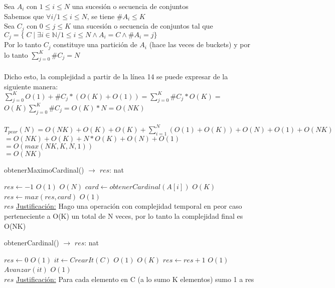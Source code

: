 \documentclass[10pt, a4paper]{article}
\begin{document}
Sea $A_i$ con $1 \leq i \leq N$ una sucesión o secuencia de conjuntos\\
Sabemos que $\forall i / 1 \leq i \leq N$, se tiene $\#A_i \leq K$\\
Sea $C_j$ con $0 \leq j \leq K$ una sucesión o secuencia de conjuntos tal que\\
$C_j = \{ \; C \; | \; \exists i \in \mathbb{N} / 1 \leq i \leq N \wedge A_i = C \wedge \#A_i = j \}$ \\
Por lo tanto $C_j$ constituye una partición de $A_i$ (hace las veces de buckets) y por lo tanto $\sum_{j=0}^{K}\#C_j = N$ \\ \\
Dicho esto, la complejidad a partir de la línea 14 se puede expresar de la siguiente manera: \\
$\sum_{j=0}^{K} O(1) + \#C_j * (O(K) + O(1)) = \sum_{j=0}^{K}\#C_j * O(K) =$\\
$O(K)\sum_{j=0}^{K}\#C_j = O(K)*N = O(NK)$
\\\\
 
$T_{peor}(N) = O(NK) + O(K) + O(K) + \sum_{i=1}^{N}(O(1) + O(K)) + O(N) + O(1) + O(NK)$\\
$= O(NK) + O(K) + N*O(K) + O(N) + O(1)$ \\
$= O(max(NK, K, N, 1))$\\
$= O(NK)$\\

\begin{algorithm}[H]{obtenerMaximoCardinal() $\to$ $res$: nat}	
	\begin{algorithmic}[1]
			 \State $res \gets -1$			\Comment $O(1)$
			 			\Comment $O(N)$
			 	\State $card\gets obtenerCardinal(A[i])$			\Comment $O(K)$
			 	\State $res\gets max(res, card)$			\Comment $O(1)$
			 \EndFor \\
			\Return $res$
		\medskip
		\Statex \underline{Justificación:} Hago una operación con complejidad temporal en peor caso perteneciente a O(K) un total de N veces, por lo tanto la complejidad final es O(NK)
    \end{algorithmic}
\end{algorithm}	



\begin{algorithm}[H]{obtenerCardinal() $\to$ $res$: nat}	
	\begin{algorithmic}[1]
			\State $res \gets 0$			\Comment $O(1)$
    		\State $it \gets CrearIt(C)$	\Comment $O(1)$
    					\Comment $O(K)$
			 	\State $res\gets res+1$	\Comment $O(1)$
			 	\State $Avanzar(it)$	\Comment $O(1)$
			 \EndWhile \\
			\Return $res$
		\medskip
		\Statex \underline{Justificación:} Para cada elemento en C (a lo sumo K elementos) sumo 1 a res
    \end{algorithmic}
\end{algorithm}
\end{document}
